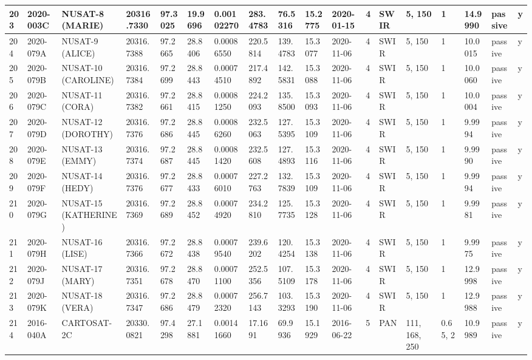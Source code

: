 \documentclass[12pt,a4paper,notitlepage,twoside,openright]{report}
\begin{document}
\begin{longtable}{|l|l|l|l|l|l|l|l|l|l|l|l|l|l|l|l|l|l|}
        203 & 2020-003C & NUSAT-8 (MARIE) & 20316.7330 & 97.3025 & 19.9696 & 0.00102270 & 283.4783 & 76.5316 & 15.2775 & 2020-01-15 & 4 & SWIR & 5, 150 & 1 & 14.9990 & passive & y \\ \hline
        204 & 2020-079A & NUSAT-9 (ALICE) & 20316.7388 & 97.2665 & 28.8406 & 0.00086550 & 220.5814 & 139.4783 & 15.3077 & 2020-11-06 & 4 & SWIR & 5, 150 & 1 & 10.0015 & passive & y \\ \hline
        205 & 2020-079B & NUSAT-10 (CAROLINE) & 20316.7384 & 97.2699 & 28.8443 & 0.00074510 & 217.4892 & 142.5831 & 15.3088 & 2020-11-06 & 4 & SWIR & 5, 150 & 1 & 10.0060 & passive & y \\ \hline
        206 & 2020-079C & NUSAT-11 (CORA) & 20316.7382 & 97.2661 & 28.8415 & 0.00081250 & 224.2093 & 135.8500 & 15.3093 & 2020-11-06 & 4 & SWIR & 5, 150 & 1 & 10.0004 & passive & y \\ \hline
        207 & 2020-079D & NUSAT-12 (DOROTHY) & 20316.7376 & 97.2686 & 28.8445 & 0.00086260 & 232.5063 & 127.5395 & 15.3109 & 2020-11-06 & 4 & SWIR & 5, 150 & 1 & 9.9994 & passive & y \\ \hline
        208 & 2020-079E & NUSAT-13 (EMMY) & 20316.7374 & 97.2687 & 28.8445 & 0.00081420 & 232.5608 & 127.4893 & 15.3116 & 2020-11-06 & 4 & SWIR & 5, 150 & 1 & 9.9990 & passive & y \\ \hline
        209 & 2020-079F & NUSAT-14 (HEDY) & 20316.7376 & 97.2677 & 28.8433 & 0.00076010 & 227.2763 & 132.7839 & 15.3109 & 2020-11-06 & 4 & SWIR & 5, 150 & 1 & 9.9994 & passive & y \\ \hline
        210 & 2020-079G & NUSAT-15 (KATHERINE) & 20316.7369 & 97.2689 & 28.8452 & 0.00074920 & 234.2810 & 125.7735 & 15.3128 & 2020-11-06 & 4 & SWIR & 5, 150 & 1 & 9.9981 & passive & y \\ \hline
        211 & 2020-079H & NUSAT-16 (LISE) & 20316.7366 & 97.2672 & 28.8438 & 0.00079540 & 239.6202 & 120.4254 & 15.3138 & 2020-11-06 & 4 & SWIR & 5, 150 & 1 & 9.9975 & passive & y \\ \hline
        212 & 2020-079J & NUSAT-17 (MARY) & 20316.7351 & 97.2678 & 28.8470 & 0.00071100 & 252.5356 & 107.5109 & 15.3178 & 2020-11-06 & 4 & SWIR & 5, 150 & 1 & 12.9998 & passive & y \\ \hline
        213 & 2020-079K & NUSAT-18 (VERA) & 20316.7347 & 97.2686 & 28.8479 & 0.00072320 & 256.7143 & 103.3293 & 15.3190 & 2020-11-06 & 4 & SWIR & 5, 150 & 1 & 12.9988 & passive & y \\ \hline
        214 & 2016-040A & CARTOSAT-2C & 20330.0821 & 97.4298 & 27.1881 & 0.00141660 & 17.1691 & 69.9936 & 15.1929 & 2016-06-22 & 5 & PAN & 111, 168, 250 & 0.65, 2 & 10.9989 & passive & y \\ \hline

\end{longtable}
\end{document}
